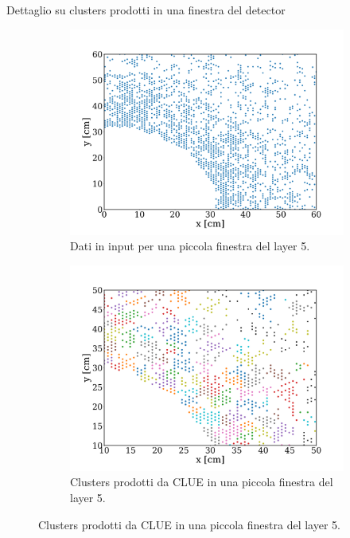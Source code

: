 \documentclass{beamer}
\begin{document}
\begin{frame}{Dettaglio su clusters prodotti in una finestra del detector}

\begin{figure}
    \centering
    \begin{subfigure}[c]{0.49\linewidth}
\includegraphics[width=\linewidth]{media/presentazione/detector_window.png}
    \caption{Dati in input per una piccola finestra del layer 5.}
    \end{subfigure}
    \hfill
    \begin{subfigure}[c]{0.49\linewidth}
        \includegraphics[width=\linewidth]{media/presentazione/clusters_detector_window.png}
        \caption{Clusters prodotti da CLUE in una piccola finestra del layer 5.}
    \end{subfigure}
\end{figure}

\end{frame}
\end{document}
